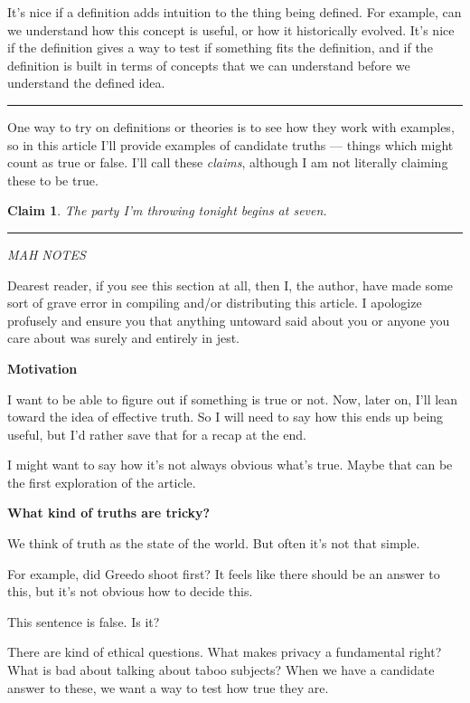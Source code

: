 \documentclass[11pt, oneside]{article}   	%
\newtheorem{claim}{Claim}
\newcommand\hr{\bigskip\hrule\bigskip}
\begin{document}
It's nice if a definition adds intuition to the thing being defined. For
example, can we understand how this concept is useful, or how it historically
evolved. It's nice if the definition gives a way to test if something fits the
definition, and if the definition is built in terms of concepts that we can
understand before we understand the defined idea.

\hr


One way to try on definitions or theories is to see how they work with examples,
so in this article I'll provide examples of candidate truths --- things which
might count as true or false. I'll call these {\em claims}, although I am not
literally claiming these to be true.

\begin{claim}
    The party I'm throwing tonight begins at seven.
\end{claim}





\bigskip
\hrule
\bigskip

{\em MAH NOTES}

Dearest reader, if you see this section at all, then I, the author,
have made some sort of grave error in compiling and/or distributing this
article. I apologize profusely and ensure you that anything untoward said
about you or anyone you care about was surely and entirely in jest.

{\bf Motivation}

I want to be able to figure out if something is true or not.
Now, later on, I'll lean toward the idea of effective truth.
So I will need to say how this ends up being useful, but I'd rather save
that for a recap at the end.

I might want to say how it's not always obvious what's true.
Maybe that can be the first exploration of the article.

{\bf What kind of truths are tricky?}

We think of truth as the state of the world. But often it's not that simple.

For example, did Greedo shoot first? It feels like there should be an answer to
this, but it's not obvious how to decide this.

This sentence is false. Is it?

There are kind of ethical questions.
What makes privacy a fundamental right?
What is bad about talking about taboo subjects?
When we have a candidate answer to these, we want a way to test how true they
are.
\end{document}
